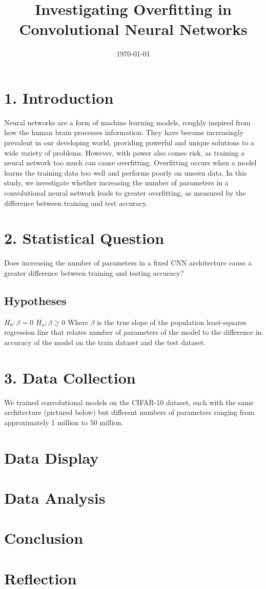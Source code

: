 \documentclass[12pt]{article}
\title{Investigating Overfitting in Convolutional Neural Networks}
\date{\today}
\begin{document}
    \maketitle

    \section*{1. Introduction}

    Neural networks are a form of machine learning models, roughly inspired from how the human brain processes information.
    They have become increasingly prevalent in our developing world, providing powerful and unique solutions to a wide variety of problems.
    However, with power also comes risk, as training a neural network too much can cause overfitting.
    Overfitting occurs when a model learns the training data too well and performs poorly on unseen data.
    In this study, we investigate whether increasing the number of parameters in a convolutional neural network
    leads to greater overfitting, as measured by the difference between training and test accuracy.

    \section*{2. Statistical Question}

    Does increasing the number of parameters in a fixed CNN architecture cause a greater difference between training and testing accuracy?

    \subsection*{Hypotheses}

    $H_0: \beta = 0$ \newline
    $H_a: \beta \geq 0$
    \newline \newline
    Where $\beta$ is the true slope of the population least-squares regression line that relates number of parameters of the model to the difference in accuracy of the model on the train dataset and the test dataset.

    \section*{3. Data Collection}

    We trained  convolutional models on the CIFAR-10 dataset, each with the same architecture (pictured below) but different numbers of
    parameters ranging from approximately 1 million to 50 million.


    \section*{Data Display}


    \section*{Data Analysis}

    \section*{Conclusion}

    \section*{Reflection}
\end{document}
